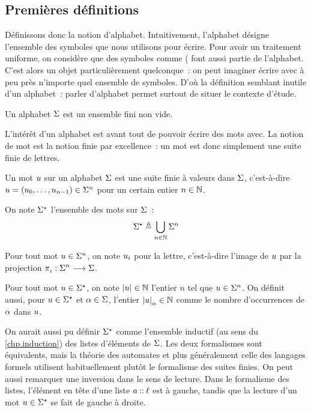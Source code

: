 \subsection{Premières définitions}

Définissons donc la notion d'alphabet. Intuitivement, l'alphabet désigne
l'ensemble des symboles que nous utilisons pour écrire. Pour avoir un traitement
uniforme, on considère que des symboles comme \og ( \fg font aussi partie de
l'alphabet. C'est alors un objet particulièrement quelconque~: on peut imaginer
écrire avec à peu près n'importe quel ensemble de symboles. D'où la définition
semblant inutile d'un alphabet~: parler d'alphabet permet surtout de situer le
contexte d'étude.

\begin{definition}[Alphabet]
  Un alphabet $\Sigma$ est un ensemble fini non vide.
\end{definition}

L'intérêt d'un alphabet est avant tout de pouvoir écrire des mots avec. La
notion de mot est la notion finie par excellence~: un mot est donc simplement
une suite finie de lettres.

\begin{definition}[Mot]
  Un mot $u$ sur un alphabet $\Sigma$ est une suite finie à valeurs dans
  $\Sigma$, c'est-à-dire $u = (u_0,\ldots,u_{n-1})\in \Sigma^n$ pour
  un certain entier $n\in\mathbb N$.

  On note $\Sigma^{\star}$ l'ensemble des mots sur $\Sigma$~:
  \[\Sigma^{\star} \triangleq \bigcup_{n\in \mathbb N} \Sigma^n\]
\end{definition}

\begin{notation}
  Pour tout mot $u\in\Sigma^n$, on note $u_i$ pour la
   lettre, c'est-à-dire l'image de $u$ par la
  projection $\mathop{\pi_{i}^{}} : \displaystyle \Sigma^n \longrightarrow \Sigma$.

  Pour tout mot $u\in\Sigma^{\star}$, on note $\left|u\right|\in\mathbb N$ l'entier $n$ tel que
  $u\in \Sigma^n$. On définit aussi, pour $u\in\Sigma^{\star}$ et
  $\alpha\in\Sigma$, l'entier $\left|u\right|_\alpha \in \mathbb N$ comme le nombre d'occurrences
  de $\alpha$ dans $u$.
\end{notation}

\begin{remark}
  On aurait aussi pu définir $\Sigma^{\star}$ comme l'ensemble inductif (au sens du
  \cref{chp.induction}) des listes d'éléments de $\Sigma$. Les deux formalismes
  sont équivalents, mais la théorie des automates et plus généralement celle des
  langages formels utilisent habituellement plutôt le formalisme des suites
  finies. On peut aussi remarquer une inversion dans le sens de lecture. Dans
  le formalisme des listes, l'élément en tête d'une liste $a\mathbin{::} \ell$ est
  à gauche, tandis que la lecture d'un mot $u \in \Sigma^{\star}$ se fait de gauche
  à droite.
\end{remark}

